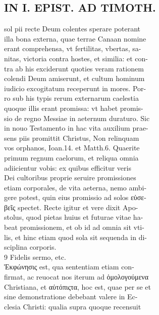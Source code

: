 \documentclass{article}
\begin{document}
\begin{pages}
\section*{IN I. EPIST. AD TIMOTH. \\
                }
sol pii recte Deum colentes sperare poterant \\
                illa bona externa, quae terrae Canaan nomine \\
                erant comprehensa, vt fertilitas, vbertas, sa- \\
                nitas, victoria contra hostes, et similia: et con- \\
                tra ab his exciderunt quoties veram rationem \\
                colendi Deum amiserunt, et cultum hominum \\
                iudicio excogitatum receperunt in mores. Por- \\
                ro sub his typis rerum externarum caelestia \\
                quoque illis erant promissa: vt habet promis- \\
                sio de regno Messiae in aeternum duraturo. Sic \\
                in nouo Testamento in hac vita auxilium prae- \\
                sens piis promittit Christus, Non relinquam \\
                vos orphanos, Ioan.14. et Matth.6. Quaerite \\
                primum regnum caelorum, et reliqua omnia \\
                adiicientur vobis: ex quibus efficitur veris \\
                Dei cultoribus proprie seruire promissiones \\
                etiam corporales, de vita aeterna, nemo ambi- \\
                gere potest, quin eius promissio ad solos εὐσε- \\
                βεῖς spectet. Recte igitur et vere dixit Apo- \\
                stolus, quod pietas huius et futurae vitae ha- \\
                beat promissionem, et ob id ad omnia sit vti- \\
                lis, et hinc etiam quod sola sit sequenda in di- \\
                sciplina corporis. \\
                9 Fidelis sermo, etc. \\
                Ἐκφώνησις est, qua sententiam etiam con- \\
                firmat, ac reuocat nos iterum ad ὁμολογούμενα \\
                Christiana, et αὐτόπιςτα, hoc est, quae per se et \\
                sine demonstratione debebant valere in Ec- \\
                clesia Christi: qualia supra quoque recensuit \\
                

\end{pages}
\end{document}
